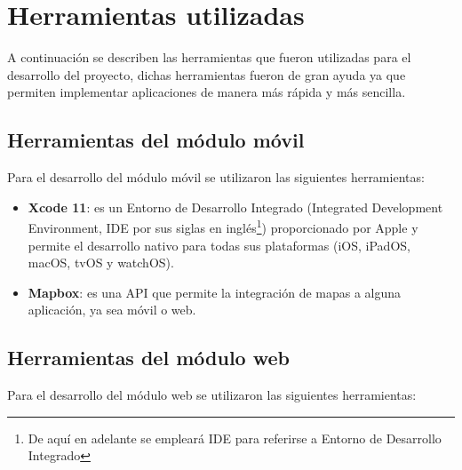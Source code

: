 \section{Herramientas utilizadas}
A continuación se describen las herramientas que fueron utilizadas para el desarrollo del proyecto, dichas herramientas fueron de gran ayuda ya que permiten implementar aplicaciones de manera más rápida y más sencilla. 

\subsection{Herramientas del módulo móvil}

Para el desarrollo del módulo móvil se utilizaron las siguientes herramientas:

\begin{itemize}
	
	\item \textbf{Xcode 11}: es un Entorno de Desarrollo Integrado (Integrated Development Environment, IDE por sus siglas en inglés\footnote{De aquí en adelante se empleará IDE para referirse a Entorno de Desarrollo Integrado}) proporcionado por Apple y permite el desarrollo nativo para todas sus plataformas (iOS, iPadOS, macOS, tvOS y watchOS)\cite{xcode}.
	
	\item \textbf{Mapbox}: es una API que permite la integración de mapas a alguna aplicación, ya sea móvil o web\cite{mapbox}.
	
\end{itemize}

\subsection{Herramientas del módulo web}

Para el desarrollo del módulo web se utilizaron las siguientes herramientas:


